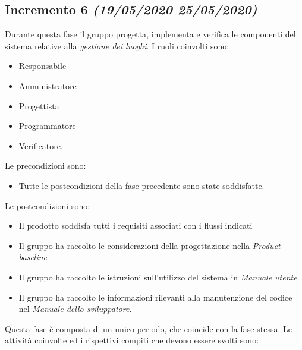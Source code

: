 \documentclass[../piano-di-progetto.tex]{subfiles}
\begin{document}
\subsection[Incremento 6]{Incremento 6 {\normalsize\normalfont\itshape(19/05/2020  25/05/2020)}}%
\label{sub:incremento_6}
Durante questa fase il gruppo progetta, implementa e verifica le componenti del sistema relative alla \textit{gestione dei luoghi}.
I ruoli coinvolti sono:
\begin{itemize}
  \item Responsabile
  \item Amministratore
  \item Progettista
  \item Programmatore
  \item Verificatore.
\end{itemize}
Le precondizioni sono:
\begin{itemize}
  \item Tutte le postcondizioni della fase precedente sono state soddisfatte.
\end{itemize}
Le postcondizioni sono:
\begin{itemize}
  \item Il prodotto soddisfa tutti i requisiti associati con i flussi indicati
  \item Il gruppo ha raccolto le considerazioni della progettazione nella \textit{Product baseline}
  \item Il gruppo ha raccolto le istruzioni sull'utilizzo del sistema in \textit{Manuale utente}
  \item Il gruppo ha raccolto le informazioni rilevanti alla manutenzione del codice nel \textit{Manuale dello sviluppatore}.
\end{itemize}
Questa fase è composta di un unico periodo, che coincide con la fase stessa.
Le attività coinvolte ed i rispettivi compiti che devono essere svolti sono:
\end{document}
